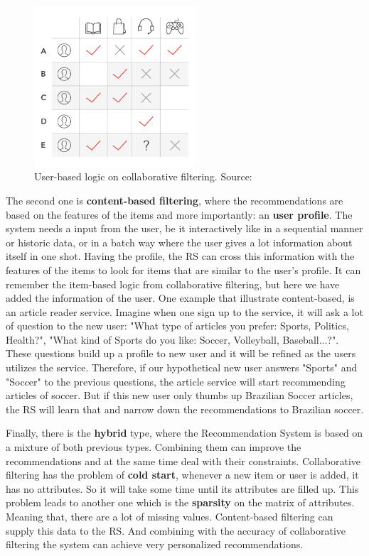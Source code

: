 \begin{figure}[h]
   \centering
   \includegraphics[width=6cm]{fig/ch2-colab-filt-user-user.jpg}
   \caption{User-based logic on collaborative filtering. Source: \cite{delawareai}}
   \label{fig:colab-filt-user-user}
\end{figure}

The second one is \textbf{content-based filtering}, where the recommendations are based on the features of the items and more importantly: an \textbf{user profile}. The system needs a input from the user, be it interactively like in a sequential manner or historic data, or in a batch way where the user gives a lot information about itself in one shot. Having the profile, the RS can cross this information with the features of the items to look for items that are similar to the user's profile. It can remember the item-based logic from collaborative filtering, but here we have added the information of the user. One example that illustrate content-based, is an article reader service. Imagine when one sign up to the service, it will ask a lot of question to the new user: "What type of articles you prefer: Sports, Politics, Health?", "What kind of Sports do you like: Soccer, Volleyball, Baseball...?". These questions build up a profile to new user and it will be refined as the users utilizes the service. Therefore, if our hypothetical new user answers "Sports" and "Soccer" to the previous questions, the article service will start recommending articles of soccer. But if this new user only thumbs up Brazilian Soccer articles, the RS will learn that and narrow down the recommendations to Brazilian soccer.

Finally, there is the \textbf{hybrid} type, where the Recommendation System is based on a mixture of both previous types. Combining them can improve the recommendations and at the same time deal with their constraints. Collaborative filtering has the problem of \textbf{cold start}, whenever a new item or user is added, it has no attributes. So it will take some time until its attributes are filled up. This problem leads to another one which is the \textbf{sparsity} on the matrix of attributes. Meaning that, there are a lot of missing values. Content-based filtering can supply this data to the RS. And combining with the accuracy of collaborative filtering the system can achieve very personalized recommendations.


